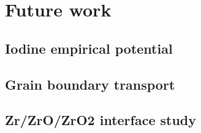 \chapter{Future work}

\label{ch:future}

\section{Iodine empirical potential}
\section{Grain boundary transport}
\section{Zr/ZrO/ZrO2 interface study}
